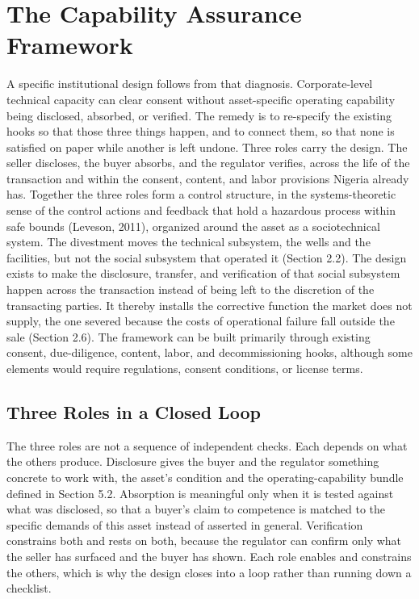 \hypertarget{the-capability-assurance-framework}{%
\section{The Capability Assurance
Framework}\label{the-capability-assurance-framework}}

A specific institutional design follows from that diagnosis.
Corporate-level technical capacity can clear consent without
asset-specific operating capability being disclosed, absorbed, or
verified. The remedy is to re-specify the existing hooks so that those
three things happen, and to connect them, so that none is satisfied on
paper while another is left undone. Three roles carry the design. The
seller discloses, the buyer absorbs, and the regulator verifies, across
the life of the transaction and within the consent, content, and labor
provisions Nigeria already has. Together the three roles form a control
structure, in the systems-theoretic sense of the control actions and
feedback that hold a hazardous process within safe bounds (Leveson,
2011), organized around the asset as a sociotechnical system. The
divestment moves the technical subsystem, the wells and the facilities,
but not the social subsystem that operated it (Section 2.2). The design
exists to make the disclosure, transfer, and verification of that social
subsystem happen across the transaction instead of being left to the
discretion of the transacting parties. It thereby installs the
corrective function the market does not supply, the one severed because
the costs of operational failure fall outside the sale (Section 2.6).
The framework can be built primarily through existing consent,
due-diligence, content, labor, and decommissioning hooks, although some
elements would require regulations, consent conditions, or license
terms.

\hypertarget{three-roles-in-a-closed-loop}{%
\subsection{Three Roles in a Closed
Loop}\label{three-roles-in-a-closed-loop}}

The three roles are not a sequence of independent checks. Each depends
on what the others produce. Disclosure gives the buyer and the regulator
something concrete to work with, the asset's condition and the
operating-capability bundle defined in Section 5.2. Absorption is
meaningful only when it is tested against what was disclosed, so that a
buyer's claim to competence is matched to the specific demands of this
asset instead of asserted in general. Verification constrains both and
rests on both, because the regulator can confirm only what the seller
has surfaced and the buyer has shown. Each role enables and constrains
the others, which is why the design closes into a loop rather than
running down a checklist.

